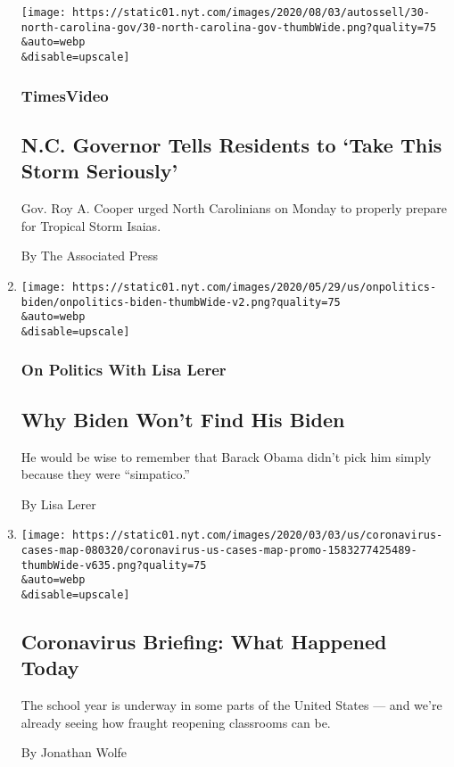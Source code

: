 \begin{enumerate}
  \texttt{[image: https://static01.nyt.com/images/2020/08/03/autossell/30-north-carolina-gov/30-north-carolina-gov-thumbWide.png?quality=75\\\&auto=webp\\\&disable=upscale]}

  \hypertarget{timesvideo-1}{%
  \subsubsection{TimesVideo}\label{timesvideo-1}}

  \hypertarget{nc-governor-tells-residents-to-take-this-storm-seriously}{%
  \subsection{N.C. Governor Tells Residents to `Take This Storm
  Seriously'}\label{nc-governor-tells-residents-to-take-this-storm-seriously}}

  Gov. Roy A. Cooper urged North Carolinians on Monday to properly
  prepare for Tropical Storm Isaias.

  By The Associated Press
\item
  \href{/2020/08/03/us/politics/joe-biden-vp.html}{}

  \texttt{[image: https://static01.nyt.com/images/2020/05/29/us/onpolitics-biden/onpolitics-biden-thumbWide-v2.png?quality=75\\\&auto=webp\\\&disable=upscale]}

  \hypertarget{on-politics-with-lisa-lerer}{%
  \subsubsection{On Politics With Lisa
  Lerer}\label{on-politics-with-lisa-lerer}}

  \hypertarget{why-biden-wont-find-his-biden}{%
  \subsection{Why Biden Won't Find His
  Biden}\label{why-biden-wont-find-his-biden}}

  He would be wise to remember that Barack Obama didn't pick him simply
  because they were ``simpatico.''

  By Lisa Lerer
\item
  \href{/2020/08/03/us/coronavirus-today.html}{}

  \texttt{[image: https://static01.nyt.com/images/2020/03/03/us/coronavirus-cases-map-080320/coronavirus-us-cases-map-promo-1583277425489-thumbWide-v635.png?quality=75\\\&auto=webp\\\&disable=upscale]}

  \hypertarget{coronavirus-briefing-what-happened-today}{%
  \subsection{Coronavirus Briefing: What Happened
  Today}\label{coronavirus-briefing-what-happened-today}}

  The school year is underway in some parts of the United States --- and
  we're already seeing how fraught reopening classrooms can be.

  By Jonathan Wolfe
\end{enumerate}

